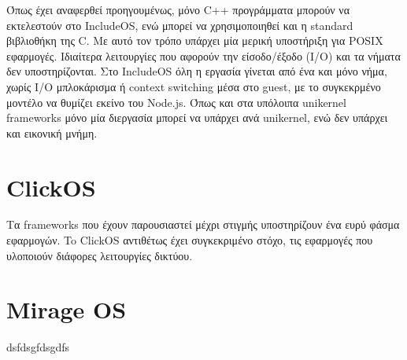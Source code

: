 Όπως έχει αναφερθεί προηγουμένως, μόνο C++ προγράμματα μπορούν να εκτελεστούν
στο IncludeOS, ενώ μπορεί να χρησιμοποιηθεί και η standard βιβλιοθήκη της C. Με
αυτό τον τρόπο υπάρχει μία μερική υποστήριξη για POSIX εφαρμογές. Ιδιαίτερα
λειτουργίες που αφορούν την είσοδο/έξοδο (Ι/Ο) και τα νήματα δεν υποστηρίζονται.
Στο IncludeOS όλη η εργασία γίνεται από ένα και μόνο νήμα, χωρίς I/O μπλοκάρισμα
ή context switching μέσα στο guest, με το συγκεκρμένο μοντέλο να θυμίζει εκείνο
του Node.js. Όπως και στα υπόλοιπα unikernel frameworks μόνο μία διεργασία
μπορεί να υπάρχει ανά unikernel, ενώ δεν υπάρχει και εικονική μνήμη.


\section{ClickOS}
Τα frameworks που έχουν παρουσιαστεί μέχρι στιγμής υποστηρίζουν ένα ευρύ φάσμα
εφαρμογών. To ClickOS αντιθέτως έχει συγκεκριμένο στόχο, τις εφαρμογές που
υλοποιούν διάφορες λειτουργίες δικτύου. 


\section{Mirage OS}
dsfdsgfdsgdfs


